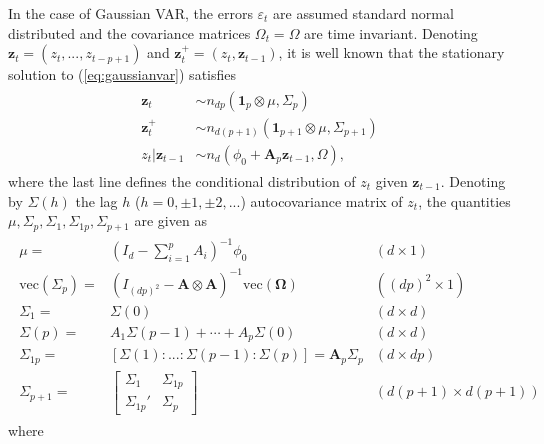 \documentclass[nojss]{jss} %
\begin{document}
In the case of Gaussian VAR, the errors $\varepsilon_t$ are assumed standard normal distributed and the covariance matrices $\Omega_t=\Omega$ are time invariant. Denoting $\boldsymbol{z}_t=(z_t,...,z_{t-p+1})$ and $\boldsymbol{z}_t^{+}=(z_t,\boldsymbol{z}_{t-1})$, it is well known that the stationary solution to (\ref{eq:gaussianvar}) satisfies
\begin{align}\label{eq:gausdist}
\begin{aligned}
\boldsymbol{z}_t & \sim n_{dp}(\boldsymbol{1}_p\otimes\mu,\Sigma_{p}) \\
\boldsymbol{z}^{+}_t & \sim n_{d(p+1)}(\boldsymbol{1}_{p+1}\otimes\mu,\Sigma_{p+1}) \\
z_t|\boldsymbol{z}_{t-1} & \sim n_d(\phi_{0} + \boldsymbol{A}_p\boldsymbol{z}_{t-1}, \Omega),
 \end{aligned}
\end{align}
where the last line defines the conditional distribution of $z_t$ given $\boldsymbol{z}_{t-1}$.  Denoting by $\Sigma(h)$ the lag $h$ ($h=0,\pm 1, \pm 2,...$) autocovariance matrix of $z_t$, the quantities $\mu,\Sigma_p,\Sigma_1,\Sigma_{1p},\Sigma_{p+1}$ are given as \cite[see, e.g.,][pp.  23,  28-29]{Lutkepohl:2005}
\begin{align}\label{eq:gausquantities}
\begin{aligned}
\mu = & (I_d - \sum_{i=1}^pA_i)^{-1}\phi_0 & (d\times 1) \\
\text{vec}(\Sigma_p) = & (I_{(dp)^2} - \boldsymbol{A}\otimes\boldsymbol{A})^{-1}\text{vec}(\boldsymbol{\Omega}) & ((dp)^2\times 1)  \\
\Sigma_1 = & \Sigma(0) %
& (d\times d) \\
\Sigma(p) = & A_1\Sigma(p - 1) + \cdots + A_p\Sigma(0) & (d\times d) \\
\Sigma_{1p} = & [\Sigma(1):...:\Sigma(p-1):\Sigma(p)] = \boldsymbol{A}_p\Sigma_p & (d\times dp) \\
\Sigma_{p+1} = &
\begin{bmatrix}
\Sigma_1       & \Sigma_{1p} \\
\Sigma_{1p}' & \Sigma_p
\end{bmatrix}
& (d(p+1) \times d(p+1))
\end{aligned}
\end{align}
where
\end{document}
